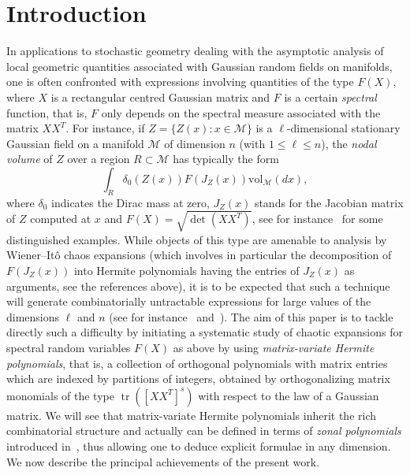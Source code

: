 \documentclass[10pt]{amsart}
\theoremstyle{definition}\newtheorem{defi}[theo]{Definition}\newtheorem{rema}[theo]{Remark}\newtheorem{exam}[theo]{Example}\newtheorem{exem}[theo]{Example}\newtheorem{nota}[theo]{Notation}
\DeclareMathOperator{\Tr}{tr}
\newcommand{\rvol}{\mathrm{vol}}
\newcommand{\clM}{\mathcal{M}}
\begin{document}
\setcounter{tocdepth}{2}
\tableofcontents
\section{Introduction}



In applications to stochastic geometry dealing with the asymptotic analysis of local geometric quantities associated with Gaussian random fields on manifolds, one is often confronted with expressions involving quantities of the type $F(X)$, where $X$ is a rectangular centred Gaussian matrix and $F$ is a certain \emph{spectral} function, that is, $F$ only depends on the spectral measure associated with the matrix $XX^T$. For instance, if $Z=\{Z(x):x\in \clM\}$ is a $\ell$-dimensional stationary Gaussian field on a manifold $\clM$ of dimension $n$ (with $1\leq \ell \leq n$), the \emph{nodal volume} of $Z$ over a region $R \subset \clM$ has typically the form
\[
\int_{R} \delta_0(Z(x)) F(J_Z(x)) \rvol_{\clM}(dx),
\]
where $\delta_0$ indicates the Dirac mass at zero, $J_Z(x)$ stands for the Jacobian matrix of $Z$ computed at $x$ and $F(X) = \sqrt{\det{(XX^T)}}$, see for instance~\cite{MPRW16,MRW17,NPR17,Not20,
Wig10} for some distinguished examples. While objects of this type are amenable to analysis by Wiener--Itô chaos expansions (which involves in particular the decomposition of $F(J_Z(x))$ into Hermite polynomials having the entries of $J_Z(x)$ as arguments, see the references above), it is to be expected that such a technique will generate combinatorially untractable expressions for large values of the dimensions $\ell$ and $n$ (see for instance~\cite{DEL19} and~\cite{Not20}). The aim of this paper is to tackle directly such a difficulty by initiating a systematic study of chaotic expansions for spectral random variables $F(X)$ as above by using \emph{matrix-variate Hermite polynomials}, that is, a collection of orthogonal polynomials with matrix entries which are indexed by partitions of integers, obtained by orthogonalizing matrix monomials of the type $\Tr([XX^T]^s)$ with respect to the law of a Gaussian matrix. We will see that matrix-variate Hermite polynomials inherit the rich combinatorial structure and actually can be defined in terms of \emph{zonal polynomials} introduced in~\cite{J61}, thus allowing one to deduce explicit formulae in any dimension. We now describe the principal achievements of the present work.
\end{document}
